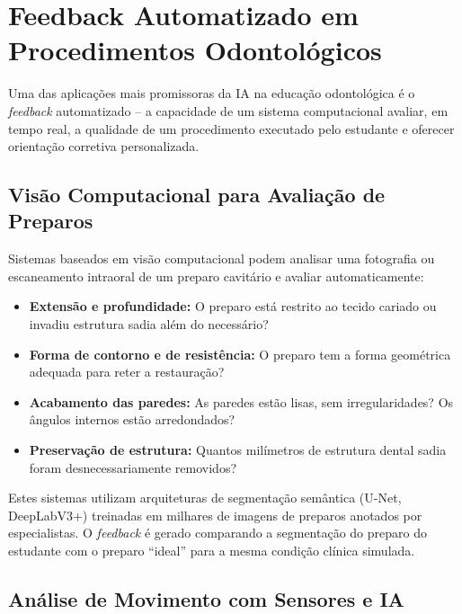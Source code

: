 
\section{Feedback Automatizado em Procedimentos Odontológicos}
\label{sec:feedback-automatizado}

\nivelcinco

Uma das aplicações mais promissoras da IA na educação odontológica é o
\textit{feedback} automatizado -- a capacidade de um sistema computacional
avaliar, em tempo real, a qualidade de um procedimento executado pelo estudante
e oferecer orientação corretiva personalizada.

\subsection{Visão Computacional para Avaliação de Preparos}

Sistemas baseados em visão computacional podem analisar uma fotografia ou
escaneamento intraoral de um preparo cavitário e avaliar automaticamente:

\begin{itemize}
  \item \textbf{Extensão e profundidade:} O preparo está restrito ao tecido
    cariado ou invadiu estrutura sadia além do necessário?
  \item \textbf{Forma de contorno e de resistência:} O preparo tem a forma
    geométrica adequada para reter a restauração?
  \item \textbf{Acabamento das paredes:} As paredes estão lisas, sem
    irregularidades? Os ângulos internos estão arredondados?
  \item \textbf{Preservação de estrutura:} Quantos milímetros de estrutura
    dental sadia foram desnecessariamente removidos?
\end{itemize}

Estes sistemas utilizam arquiteturas de segmentação semântica (U-Net,
DeepLabV3+) treinadas em milhares de imagens de preparos anotados por
especialistas. O \textit{feedback} é gerado comparando a segmentação do preparo
do estudante com o preparo ``ideal'' para a mesma condição clínica simulada.

\subsection{Análise de Movimento com Sensores e IA}

